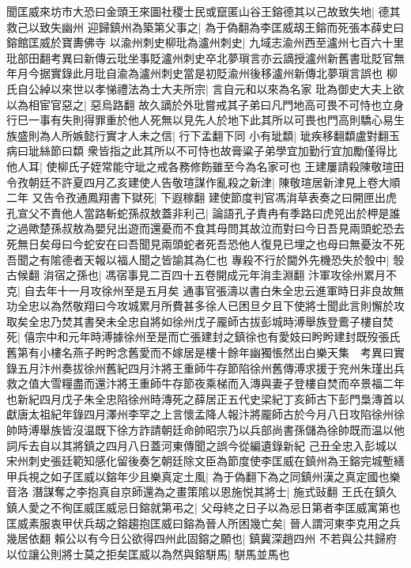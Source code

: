 聞匡威來坊市大恐曰金頭王來圖社稷士民或竄匿山谷王鎔德其以己故致失地|{
	德其救己以致失幽州}
迎歸鎮州為築第父事之|{
	為于偽翻為李匡威刼王鎔而死張本薛史曰鎔館匡威於寶夀佛寺}
以渝州刺史柳玭為瀘州刺史|{
	九域志渝州西至瀘州七百六十里玭部田翻考異曰新傳云玭坐事貶瀘州刺史卒北夢瑣言亦云謫授瀘州新舊書玭貶官無年月今据實錄此月玭自渝為瀘州刺史當是初貶渝州後移瀘州新傳北夢瑣言誤也}
柳氏自公綽以來世以孝悌禮法為士大夫所宗|{
	言自元和以來為名家}
玭為御史大夫上欲以為相宦官惡之|{
	惡烏路翻}
故久謫於外玭嘗戒其子弟曰凡門地高可畏不可恃也立身行巳一事有失則得罪重於他人死無以見先人於地下此其所以可畏也門高則驕心易生族盛則為人所嫉懿行實才人未之信|{
	行下孟翻下同}
小有玼纇|{
	玼疾移翻纇盧對翻玉病曰玼絲節曰纇}
衆皆指之此其所以不可恃也故膏粱子弟學宜加勤行宜加勵僅得比他人耳|{
	使柳氏子姪常能守玼之戒各務修飭雖至今為名家可也}
王建屢請殺陳敬瑄田令孜朝廷不許夏四月乙亥建使人告敬瑄謀作亂殺之新津|{
	陳敬瑄居新津見上卷大順二年}
又告令孜通鳳翔書下獄死|{
	下遐稼翻}
建使節度判官馮㳙草表奏之曰開匣出虎孔宣父不責他人當路斬蛇孫叔敖蓋非利己|{
	論語孔子責冉有季路曰虎兕出於柙是誰之過歟楚孫叔敖為嬰兒出遊而還憂而不食其母問其故泣而對曰今日吾見兩頭蛇恐去死無日矣母曰今蛇安在曰吾聞見兩頭蛇者死吾恐他人復見已埋之也母曰無憂汝不死吾聞之有隂德者天報以福人聞之皆諭其為仁也}
專殺不行於閫外先機恐失於彀中|{
	彀古候翻}
㳙宿之孫也|{
	馮宿事見二百四十五卷開成元年㳙圭淵翻}
汴軍攻徐州累月不克|{
	自去年十一月攻徐州至是五月矣}
通事官張濤以書白朱全忠云進軍時日非良故無功全忠以為然敬翔曰今攻城累月所費甚多徐人已困旦夕且下使將士聞此言則懈於攻取矣全忠乃焚其書癸未全忠自將如徐州戊子龎師古拔彭城時溥舉族登鷰子樓自焚死|{
	僖宗中和元年時溥據徐州至是而亡張建封之鎮徐也有愛妓曰盻盻建封既歿張氏舊第有小樓名燕子盻盻念舊愛而不嫁居是樓十餘年幽獨悵然出白樂天集　考異曰實錄五月汴州奏拔徐州舊紀四月汴將王重師牛存節陷徐州舊傳溥求援于兖州朱瑾出兵救之值大雪糧盡而還汴將王重師牛存節夜乘梯而入漙與妻子登樓自焚而卒景福二年也新紀四月戊子朱全忠陷徐州時漙死之薛居正五代史梁紀丁亥師古下彭門梟漙首以獻唐太祖紀年錄四月澤州李罕之上言懷孟降人報汴將龎師古於今月八日攻陷徐州徐帥時溥舉族皆沒温既下徐方詐請朝廷命帥昭宗乃以兵部尚書孫儲為徐帥既而温以他詞斥去自以其將鎮之四月八日蓋河東傳聞之誤今從編遺錄新紀}
己丑全忠入彭城以宋州刺史張廷範知感化留後奏乞朝廷除文臣為節度使李匡威在鎮州為王鎔完城塹繕甲兵視之如子匡威以鎔年少且樂真定土風|{
	為于偽翻下為之同鎮州漢之真定國也樂音洛}
潛謀奪之李抱真自京師還為之畫策隂以恩施悦其將士|{
	施式䜴翻}
王氏在鎮久鎮人愛之不徇匡威匡威忌日鎔就第弔之|{
	父母終之日子以為忌日第者李匡威寓第也}
匡威素服衷甲伏兵刼之鎔趨抱匡威曰鎔為晉人所困幾亡矣|{
	晉人謂河東李克用之兵幾居依翻}
賴公以有今日公欲得四州此固鎔之願也|{
	鎮冀深趙四州}
不若與公共歸府以位讓公則將士莫之拒矣匡威以為然與鎔駢馬|{
	駢馬並馬也}
